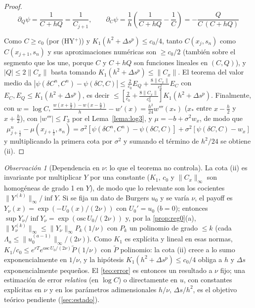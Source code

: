 \documentclass[11pt,letterpaper]{article}
\theoremstyle{plain}
\theoremstyle{definition}
\theoremstyle{remark}
\newtheorem{observacion}[theorem]{Observación}
\numberwithin{equation}{section}
\newcommand{\norm}[1]{\lVert #1\rVert}
\begin{document}
\begin{proof}
		\[
		\partial_Q\psi=\frac{1}{C+hQ}=\frac1{C_{j+1}},\qquad \partial_C\psi=\frac1h\left(\frac1{C+hQ}-\frac1C\right)=-\frac{Q}{C\,(C+hQ)}
		\]
		
		Como \(C\ge c_0\) (por (HY\(^+\))) y \(K_1(h^2+\Delta s^p)\le c_0/4\), tanto \(C(x_j,s_n)\) como \(C(x_{j+1},s_n)\) y sus aproximaciones numéricas son \(\ge c_0/2\) (también sobre el segmento que los une, porque \(C\) y \(C+hQ\) son funciones lineales en \((C,Q)\)), y \(|Q|\le2\norm{C_x}\) basta tomando \(K_1(h^2+\Delta s^p)\le\norm{C_x}\). El teorema del valor medio da \(|\psi(\delta C^n,C^n)-\psi(\delta C,C)|\le\frac2{c_0}E_Q+\frac{8\norm{C_x}}{c_0^2}E_C\) con \(E_C,E_Q\le K_1(h^2+\Delta s^p)\), es decir \(\le\left[\frac2{c_0}+\frac{8\norm{C_x}}{c_0^2}\right]K_1(h^2+\Delta s^p)\). Finalmente, con \(w=\log C\), \(\frac{w(x+\frac h2)-w(x-\frac h2)}{h}-w'(x)=\frac{h^2}{24}w'''(x_\ast)\) (\(x_\ast\) entre \(x-\frac h2\) y \(x+\frac h2\)), con \(|w'''|\le\Gamma_3\) por el Lema~\ref{lema:log3}, y \(\mu=-b+\sigma^2w_x\), de modo que
		\[
		\mu^n_{j+\frac12}-\mu(x_{j+\frac12},s_n)=\sigma^2\left[\psi(\delta C^n,C^n)-\psi(\delta C,C)\right]+\sigma^2\left[\psi(\delta C,C)-w_x\right]
		\]
		y multiplicando la primera cota por \(\sigma^2\) y sumando el término de \(h^2/24\) se obtiene (ii).
		
	\end{proof}
	
	\begin{observacion}[Dependencia en \(\nu\): lo que el teorema no controla]\label{obs:nu}
		La cota (ii) es invariante por multiplicar \(Y\) por una constante (\(K_1\), \(c_0\) y \(\norm{C_x}_\infty\) son homogéneas de grado 1 en \(Y\)), de modo que lo relevante son los cocientes \(\norm{Y^{(k)}}_\infty/\inf Y\). Si se fija un dato de Burgers \(u_0\) y se varía \(\nu\), el payoff es \(Y_\nu(x)=\exp\left(-U_0(x)/(2\nu)\right)\) con \(U_0'=u_0\) (\(b=0\)); entonces \(\sup Y_\nu/\inf Y_\nu=\exp\left(\mathrm{osc}\,U_0/(2\nu)\right)\) y, por la \cref{prop:reg0}(a), \(\norm{Y_\nu^{(k)}}_\infty\le\norm{Y_\nu}_\infty P_k(1/\nu)\) con \(P_k\) un polinomio de grado \(\le k\) (cada \(\Lambda_a\le\norm{u_0^{(a-1)}}_\infty/(2\nu)\)). Como \(K_1\) es explícita y lineal en esas normas, \(K_1/c_0\le e^{rT}e^{\mathrm{osc}\,U_0/(2\nu)}\tilde P(1/\nu)\) con \(\tilde P\) polinomio: la cota (ii) crece a lo sumo exponencialmente en \(1/\nu\), y la hipótesis \(K_1(h^2+\Delta s^p)\le c_0/4\) obliga a \(h\) y \(\Delta s\) exponencialmente pequeños. El \cref{teo:error} es entonces un resultado a \(\nu\) fijo; una estimación de error \emph{relativa} (en \(\log C\)) o directamente en \(u\), con constantes explícitas en \(\nu\) y en los parámetros adimensionales \(h/\nu\), \(\Delta s/h^2\), es el objetivo teórico pendiente (\cref{sec:estado}).
	\end{observacion}
	
\end{document}

